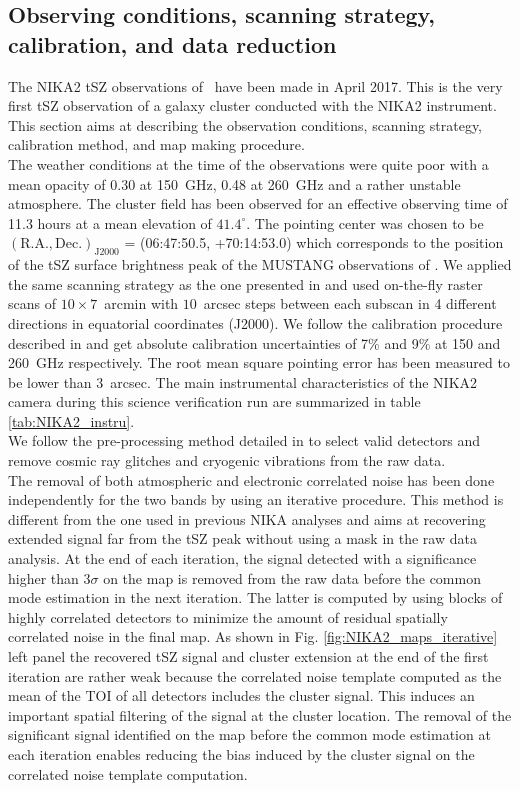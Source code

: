 \documentclass[traditabstract]{aa}
\begin{document}
\subsection{Observing conditions, scanning strategy, calibration, and data reduction}
The NIKA2 tSZ observations of \psz\ have been made in April 2017. This is the very first tSZ observation of a galaxy cluster conducted with the NIKA2 instrument. This section aims at describing the observation conditions, scanning strategy, calibration method, and map making procedure.\\
\indent The weather conditions at the time of the observations were quite poor with a mean opacity of 0.30 at 150~GHz, 0.48 at 260~GHz and a rather unstable atmosphere. The cluster field has been observed for an effective observing time of 11.3 hours at a mean elevation of $41.4^{\circ}$. The pointing center was chosen to be $(\mathrm{R.A., Dec.})_{\mathrm{J2000}}$ = (06:47:50.5, +70:14:53.0) which corresponds to the position of the tSZ surface brightness peak of the MUSTANG observations of \psz \citep{you15}. We applied the same scanning strategy as the one presented in \citep{ada15,rup17} and used on-the-fly raster scans of $10\times 7$~arcmin with $10$~arcsec steps between each subscan in 4 different directions in equatorial coordinates (J2000). We follow the calibration procedure described in \cite{ada17a} and get absolute calibration uncertainties of 7\% and 9\% at 150 and 260~GHz respectively. The root mean square pointing error has been measured to be lower than 3~arcsec. The main instrumental characteristics of the NIKA2 camera during this science verification run are summarized in table \ref{tab:NIKA2_instru}.\\
\indent We follow the pre-processing method detailed in \citep{ada15} to select valid detectors and remove cosmic ray glitches and cryogenic vibrations from the raw data.\\
\indent The removal of both atmospheric and electronic correlated noise has been done independently for the two bands by using an iterative procedure. This method is different from the one used in previous NIKA analyses and aims at recovering extended signal far from the tSZ peak without using a mask in the raw data analysis. At the end of each iteration, the signal detected with a significance higher than $3\sigma$ on the map is removed from the raw data before the common mode estimation in the next iteration. The latter is computed by using blocks of highly correlated detectors to minimize the amount of residual spatially correlated noise in the final map. As shown in Fig. \ref{fig:NIKA2_maps_iterative} left panel the recovered tSZ signal and cluster extension at the end of the first iteration are rather weak because the correlated noise template computed as the mean of the TOI of all detectors includes the cluster signal. This induces an important spatial filtering of the signal at the cluster location. The removal of the significant signal identified on the map before the common mode estimation at each iteration enables reducing the bias induced by the cluster signal on the correlated noise template computation.\\
\end{document}

